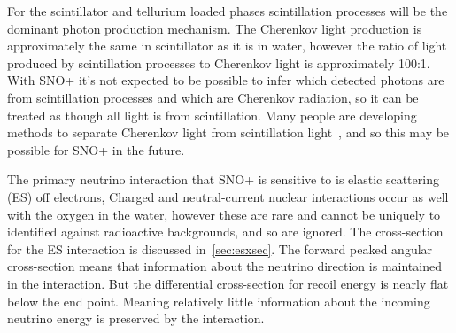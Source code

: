 For the scintillator and tellurium loaded phases scintillation processes will be
the dominant photon production mechanism.
The Cherenkov light production is approximately the same in scintillator as it is in
water, however the ratio of light produced by scintillation processes to Cherenkov
light is approximately 100:1.
With SNO+ it's not expected to be possible to infer which detected photons are
from scintillation processes and which are Cherenkov radiation, so it can be treated
as though all light is from scintillation.
Many people are developing methods to separate Cherenkov light from scintillation
light~\citep{tanners_paper,javi_chess, winslow_directionality},
and so this may be possible for SNO+ in the future.

The primary neutrino interaction that SNO+ is sensitive to is elastic scattering (ES)
off electrons,
Charged and neutral-current nuclear interactions occur as well with the oxygen in the water,
however these are rare and cannot be uniquely to identified against radioactive
backgrounds, and so are ignored.
The cross-section for the ES interaction is discussed in~\ref{sec:esxsec}.
The forward peaked angular cross-section means that information about the
neutrino direction is maintained in the interaction.
But the differential cross-section for recoil energy is nearly flat below the
end point. Meaning relatively little information about the incoming neutrino energy
is preserved by the interaction.






